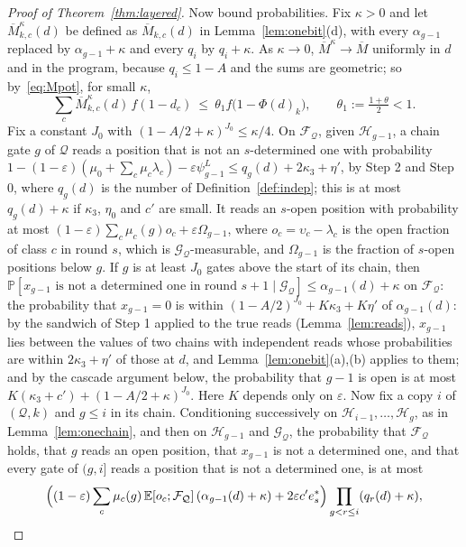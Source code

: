 \documentclass[11pt]{amsart}
\theoremstyle{definition}
\theoremstyle{remark}
\newcommand{\eps}{\varepsilon}
\newcommand{\PP}{\mathbb{P}}
\newcommand{\EE}{\mathbb{E}}
\begin{document}
\begin{proof}[Proof of Theorem~\ref{thm:layered}]
Now bound probabilities. Fix $\kappa>0$ and let $\overline M^\kappa_{k,c}(d)$ be defined as
$\overline M_{k,c}(d)$ in Lemma~\ref{lem:onebit}(d), with every $\alpha_{g-1}$ replaced by
$\alpha_{g-1}+\kappa$ and every $q_i$ by $q_i+\kappa$. As $\kappa\to0$, $\overline M^\kappa\to\overline M$
uniformly in $d$ and in the program, because $q_i\le1-A$ and the sums are geometric; so
by~\eqref{eq:Mpot}, for small $\kappa$,
\begin{equation}\label{eq:Mpotkappa}
\sum_c\overline M^\kappa_{k,c}(d)\,f(1-d_c)\ \le\ \theta_1f\bigl(1-\Phi(d)_k\bigr),\qquad\theta_1:=\tfrac{1+\theta}2<1 .
\end{equation}
Fix a constant $J_0$ with $(1-A/2+\kappa)^{J_0}\le\kappa/4$. On $\mathcal F_{\mathcal Q}$, given
$\mathcal H_{g-1}$, a chain gate $g$ of $\mathcal Q$ reads a position that is not an $s$-determined
one with probability $1-(1-\eps)(\mu_0+\sum_c\mu_c\lambda_c)-\eps\psi^L_{g-1}\le q_g(d)+2\kappa_3+\eta'$,
by Step 2 and Step 0, where $q_g(d)$ is the number of Definition~\ref{def:indep}; this is at most
$q_g(d)+\kappa$ if $\kappa_3$, $\eta_0$ and $c'$ are small. It reads an $s$-open position with
probability at most $(1-\eps)\sum_c\mu_c(g)o_c+\eps\Omega_{g-1}$, where $o_c=\upsilon_c-\lambda_c$ is the
open fraction of class $c$ in round $s$, which is $\mathcal G_{\mathcal Q}$-measurable, and
$\Omega_{g-1}$ is the fraction of $s$-open positions below $g$. If $g$ is at least $J_0$ gates above the start of its
chain, then $\PP[x_{g-1}\text{ is not a determined one in round }s+1\mid\mathcal G_{\mathcal Q}]\le\alpha_{g-1}(d)+\kappa$
on $\mathcal F_{\mathcal Q}$: the probability that $x_{g-1}=0$ is within $(1-A/2)^{J_0}+K\kappa_3+K\eta'$
of $\alpha_{g-1}(d)$: by the sandwich of Step 1 applied to the true reads (Lemma~\ref{lem:reads}),
$x_{g-1}$ lies between the values of two chains with independent reads whose probabilities are
within $2\kappa_3+\eta'$ of those at $d$, and Lemma~\ref{lem:onebit}(a),(b) applies to them; and by the cascade argument below,
the probability that $g-1$ is open is at most $K(\kappa_3+c')+(1-A/2+\kappa)^{J_0}$. Here $K$
depends only on $\eps$. Now fix a copy $i$ of $(\mathcal Q,k)$ and $g\le i$ in its chain.
Conditioning successively on $\mathcal H_{i-1},\dots,\mathcal H_g$, as in
Lemma~\ref{lem:onechain}, and then on $\mathcal H_{g-1}$ and $\mathcal G_{\mathcal Q}$, the
probability that $\mathcal F_{\mathcal Q}$ holds, that $g$ reads an open position, that $x_{g-1}$ is
not a determined one, and that every gate of $(g,i]$ reads a position that is not a determined one,
is at most
\[
\Bigl((1-\eps)\sum_c\mu_c(g)\,\EE[o_c;\mathcal F_{\mathcal Q}]\,(\alpha_{g-1}(d)+\kappa)+2\eps c'e^*_s\Bigr)\prod_{g<r\le i}(q_r(d)+\kappa),
\]
\end{proof}
\end{document}
